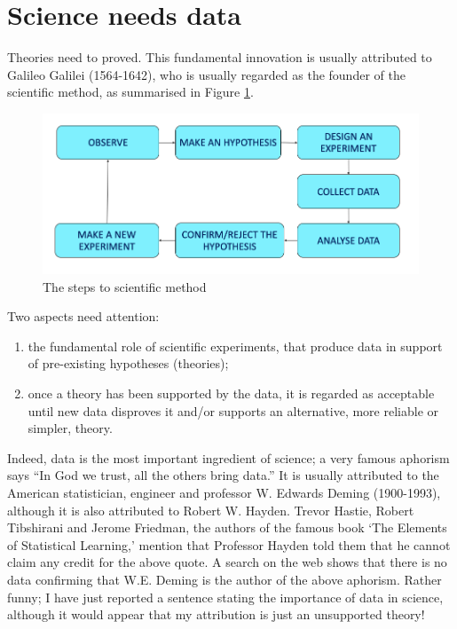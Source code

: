 \documentclass[a4paper,12pt,oneside]{book}
\providecommand{\tightlist}{%
  \setlength{\itemsep}{0pt}\setlength{\parskip}{0pt}}
\begin{document}
\hypertarget{science-needs-data}{%
\section{Science needs data}\label{science-needs-data}}

Theories need to proved. This fundamental innovation is usually attributed to Galileo Galilei (1564-1642), who is usually regarded as the founder of the scientific method, as summarised in Figure \ref{fig:figName11}.

\begin{figure}

{\centering \includegraphics[width=0.75\linewidth]{_images/MSAMap} 

}

\caption{The steps to scientific method}\label{fig:figName11}
\end{figure}

Two aspects need attention:

\begin{enumerate}
\def\labelenumi{\arabic{enumi}.}
\tightlist
\item
  the fundamental role of scientific experiments, that produce data in support of pre-existing hypotheses (theories);
\item
  once a theory has been supported by the data, it is regarded as acceptable until new data disproves it and/or supports an alternative, more reliable or simpler, theory.
\end{enumerate}

Indeed, data is the most important ingredient of science; a very famous aphorism says ``In God we trust, all the others bring data.'' It is usually attributed to the American statistician, engineer and professor W. Edwards Deming (1900-1993), although it is also attributed to Robert W. Hayden. Trevor Hastie, Robert Tibshirani and Jerome Friedman, the authors of the famous book `The Elements of Statistical Learning,' mention that Professor Hayden told them that he cannot claim any credit for the above quote. A search on the web shows that there is no data confirming that W.E. Deming is the author of the above aphorism. Rather funny; I have just reported a sentence stating the importance of data in science, although it would appear that my attribution is just an unsupported theory!
\end{document}
